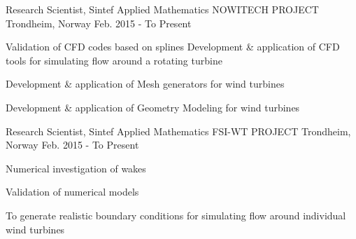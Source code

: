 

\begin{cventries}
	\cventry
	{Research Scientist, Sintef Applied Mathematics} %
	{NOWITECH PROJECT} %
	{Trondheim, Norway} %
	{Feb. 2015 - To Present} %
	{
		\begin{cvitems} %
	\item{Validation of CFD codes based on splines Development \& application of CFD tools for simulating flow around a rotating turbine}
	\item{Development \& application of Mesh generators for wind turbines}
	\item{Development \& application of Geometry Modeling for wind turbines}
		\end{cvitems}
	}
  \cventry
  {Research Scientist, Sintef Applied Mathematics} %
  {FSI-WT PROJECT} %
  {Trondheim, Norway} %
  {Feb. 2015 - To Present} %
  {
  	\begin{cvitems} %
\item{Numerical investigation of wakes}
\item{Validation of numerical models}
\item{To generate realistic boundary conditions for simulating flow around individual wind turbines}
	 \end{cvitems}
  }
\end{cventries}